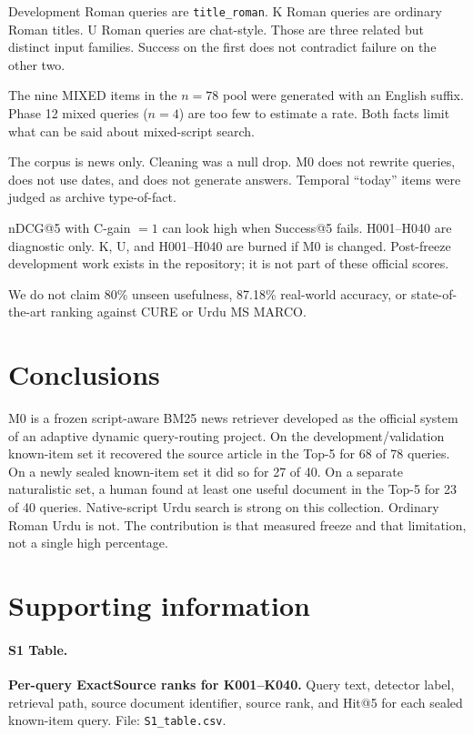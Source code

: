 \documentclass[10pt,letterpaper]{article}
\begin{document}
Development Roman queries are \texttt{title\_roman}. K Roman queries are ordinary Roman titles. U Roman queries are chat-style. Those are three related but distinct input families. Success on the first does not contradict failure on the other two.

The nine MIXED items in the $n = 78$ pool were generated with an English suffix. Phase 12 mixed queries ($n = 4$) are too few to estimate a rate. Both facts limit what can be said about mixed-script search.

The corpus is news only. Cleaning was a null drop. M0 does not rewrite queries, does not use dates, and does not generate answers. Temporal ``today'' items were judged as archive type-of-fact.

nDCG@5 with C-gain $= 1$ can look high when Success@5 fails. H001--H040 are diagnostic only. K, U, and H001--H040 are burned if M0 is changed. Post-freeze development work exists in the repository; it is not part of these official scores.

We do not claim 80\% unseen usefulness, 87.18\% real-world accuracy, or state-of-the-art ranking against CURE or Urdu MS MARCO.

\section*{Conclusions}

M0 is a frozen script-aware BM25 news retriever developed as the official system of an adaptive dynamic query-routing project. On the development/validation known-item set it recovered the source article in the Top-5 for 68 of 78 queries. On a newly sealed known-item set it did so for 27 of 40. On a separate naturalistic set, a human found at least one useful document in the Top-5 for 23 of 40 queries. Native-script Urdu search is strong on this collection. Ordinary Roman Urdu is not. The contribution is that measured freeze and that limitation, not a single high percentage.

\section*{Supporting information}

\paragraph*{S1 Table.}
\label{S1_Table}
\textbf{Per-query ExactSource ranks for K001--K040.} Query text, detector label, retrieval path, source document identifier, source rank, and Hit@5 for each sealed known-item query. File: \texttt{S1\_table.csv}.
\end{document}
